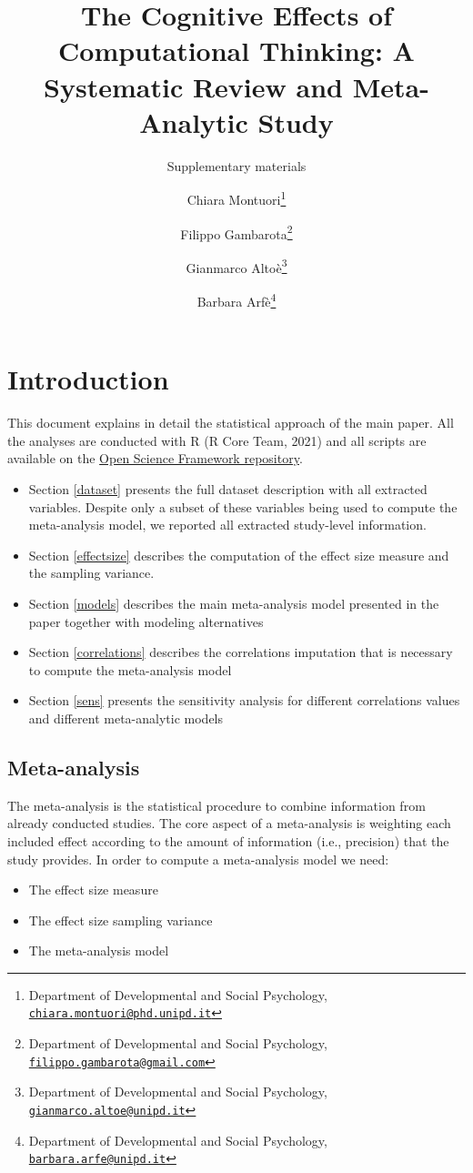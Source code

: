 \documentclass[
]{article}
\title{The Cognitive Effects of Computational Thinking: A Systematic Review and Meta-Analytic Study}
\subtitle{Supplementary materials}
\author{Chiara Montuori\footnote{Department of Developmental and Social Psychology, \href{mailto:chiara.montuori@phd.unipd.it}{\nolinkurl{chiara.montuori@phd.unipd.it}}} \and Filippo Gambarota\footnote{Department of Developmental and Social Psychology, \href{mailto:filippo.gambarota@gmail.com}{\nolinkurl{filippo.gambarota@gmail.com}}} \and Gianmarco Altoè\footnote{Department of Developmental and Social Psychology, \href{mailto:gianmarco.altoe@unipd.it}{\nolinkurl{gianmarco.altoe@unipd.it}}} \and Barbara Arfè\footnote{Department of Developmental and Social Psychology, \href{mailto:barbara.arfe@unipd.it}{\nolinkurl{barbara.arfe@unipd.it}}}}
\date{}
\providecommand{\tightlist}{%
  \setlength{\itemsep}{0pt}\setlength{\parskip}{0pt}}
\begin{document}
\maketitle

{
\setcounter{tocdepth}{2}
\tableofcontents
}
\pagebreak

\hypertarget{introduction}{%
\section{Introduction}\label{introduction}}

This document explains in detail the statistical approach of the main paper. All the analyses are conducted with R (R Core Team, 2021) and all scripts are available on the \href{https://osf.io/uvbcd/}{Open Science Framework repository}.

\begin{itemize}
\tightlist
\item
  Section \ref{dataset} presents the full dataset description with all extracted variables. Despite only a subset of these variables being used to compute the meta-analysis model, we reported all extracted study-level information.
\item
  Section \ref{effectsize} describes the computation of the effect size measure and the sampling variance.
\item
  Section \ref{models} describes the main meta-analysis model presented in the paper together with modeling alternatives
\item
  Section \ref{correlations} describes the correlations imputation that is necessary to compute the meta-analysis model
\item
  Section \ref{sens} presents the sensitivity analysis for different correlations values and different meta-analytic models
\end{itemize}

\hypertarget{meta-analysis}{%
\subsection{Meta-analysis}\label{meta-analysis}}

The meta-analysis is the statistical procedure to combine information from already conducted studies. The core aspect of a meta-analysis is weighting each included effect according to the amount of information (i.e., precision) that the study provides. In order to compute a meta-analysis model we need:

\begin{itemize}
\tightlist
\item
  The effect size measure
\item
  The effect size sampling variance
\item
  The meta-analysis model
\end{itemize}
\end{document}
